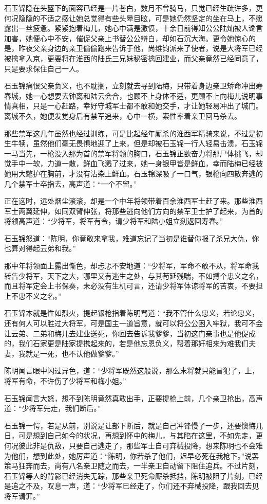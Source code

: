 石玉锦隐在头盔下的面容已经是一片苍白，数月不曾骑马，只觉已经生疏许多，更何况隐隐的不适之感让她总觉得有些头晕目眩，可是她仍然坚定的坐在马上，不愿露出一丝疲惫。紧紧抱着梅儿，她心中满是激愤，十余日前得知公公陆灿被人谗言加害，她便心中不安，催促父亲上书替公公辩白，却如石沉大海。更令她惊心的是，昨夜父亲身边的亲卫偷偷跑来告诉于他，尚维钧派来了使者，说是大将军已经被擒拿入京，更要将在淮西的陆氏三兄妹秘密擒回建业，而父亲竟然已经同意了，只是要求保住自己一人。

石玉锦痛恨父亲负义，也不耽搁，立刻就去寻到陆梅，只带着身边亲卫矫命冲出寿春城，她一心想要去钟离和陆云会合，也顾不上身体不适，更顾不上向梅儿说明事情真相，只是一心赶路，幸好守城军士都不敢和她交手，才让她轻易冲出了城门。离城不久，她便发觉身后有禁军追来，心中一横，索性率着亲卫回马杀去。

那些禁军这几年虽然也经过训练，可是比起经年厮杀的淮西军精骑来说，不过是初生牛犊，虽然他们毫无畏惧地迎了上来，但是却被石玉锦一行人轻易击溃，石玉锦一马当先，一枪没入那为首的禁军将领的胸口，石玉锦正欲奋力将那尸体挑飞，却觉手中一软，力道一散，鲜血飞溅了过来，她一身银甲皆是鲜血，幸而陆梅已经被她用大氅护在胸前，才没有沾染上鲜血。石玉锦深吸了一口气，银枪向四散奔逃的几个禁军士卒指去，高声道：“一个不留。”

正在这时，远处烟尘滚滚，却是一个中年将领带着百余淮西军士赶了来。那些淮西军士两翼延伸，如同双臂伸张，将那些逃向他们方向的禁军卫士护了起来，为首的将领高声道：“少将军，将军有令，请少将军和陆小姐立刻返回寿春。”

石玉锦怒道：“陈明，你竟敢来拿我，难道忘记了当初是谁替你报了杀兄大仇，你也算对得起云弟和我。”

那中年将领面上露出惭色，却忐忑不安地道：“少将军，军命不敢不从，将军命我转告少将军，天下之大，哪里又有逃生之处，与其苟延残喘，不如搏个忠义之名，而且将军定会上书保奏，未必没有生机可言，还请少将军体谅将军的苦衷，不要担上不忠不义之名。”

石玉锦本就是性如烈火，提起银枪指着陈明骂道：“我不管什么忠义，若论忠义，还有何人可以胜过大将军，可是国主一道旨意，就可以将公公困入牢狱，我可不会让云弟、二弟和梅儿去建业送死，你回去告诉我爹爹，当初这门亲事也是他促成的，我们石家更是陆家提携起来的，若是他忘恩负义，帮着那奸相来为难我们夫妻，我就是一死，也不认他做爹爹。”

陈明闻言眼中闪过异色，道：“少将军既然这般说，那么末将就只能冒犯了，上，将军有命，不许伤了少将军和梅小姐。”

石玉锦闻言大怒，想不到陈明竟然真敢出手，正要提枪上前，几个亲卫抢出，高声道：“少将军先走，我们断后。”

石玉锦一愕，若是从前，别说是让部下断后，就是自己冲锋慢了一步，还要懊悔几日，可是想到自己如今的状况，再想到怀中的梅儿，与其陷在这里，不如先走，更何况彼此非是仇敌，只要自己逃走了，那些军士自可弃械投降，想来陈明也不会难为他们，想到此处，她厉声道：“陈明，你若杀了他们，迟早必死在我枪下。”说罢策马狂奔而去，尚有八名亲卫随之而去，一半亲卫自动留下阻住追兵。不过片刻，石玉锦等人的背影已经消失无踪，那些亲卫死命厮杀抵挡，陈明被阻了片刻，已经是追之不及，叹息一声，道：“少将军已经走了，你们还不弃械投降，跟我回去见将军请罪。”

